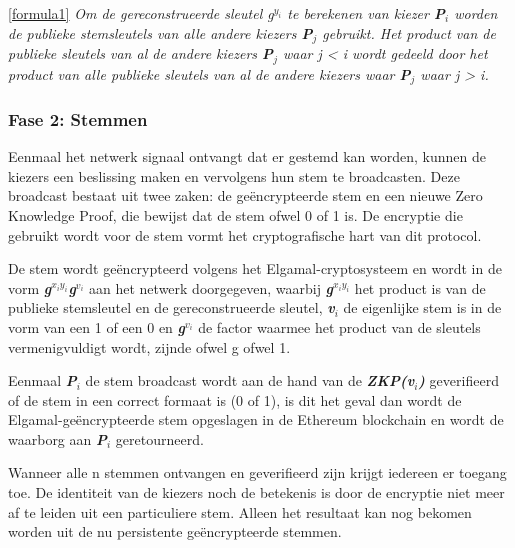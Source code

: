 			\eqref{formula1} \textit{Om de gereconstrueerde sleutel g$^{y_{i}}$ te berekenen van kiezer \textbf{P$_{i}$} worden de publieke stemsleutels van alle andere kiezers \textbf{P$_{j}$} gebruikt. Het product van de publieke sleutels van al de andere kiezers \textbf{P$_{j}$} waar j < i wordt gedeeld door het product van alle publieke sleutels van al de andere kiezers waar \textbf{P$_{j}$} waar  j > i.}
			
		\subsubsection*{Fase 2: Stemmen}
			Eenmaal het netwerk signaal ontvangt dat er gestemd kan worden, kunnen de kiezers een beslissing maken en vervolgens hun stem te broadcasten. Deze broadcast bestaat uit twee zaken: de geëncrypteerde stem en een nieuwe Zero Knowledge Proof, die bewijst dat de stem ofwel 0 of 1 is. De encryptie die gebruikt wordt voor de stem vormt het cryptografische hart van dit protocol. 
			
			De stem wordt geëncrypteerd volgens het Elgamal-cryptosysteem en wordt in de vorm  \textbf{\textit{g$^{x_{i}y_{i}}$g$^{v_{i}}$}} aan het netwerk doorgegeven,  waarbij  \textbf{\textit{g$^{x_{i}y_{i}}$}} het product is van de publieke stemsleutel en de gereconstrueerde sleutel, \textbf{\textit{v$_{i}$}} de eigenlijke stem is in de vorm van een 1 of een 0 en \textbf{\textit{g$^{v_{i}}$}} de factor waarmee het product van de sleutels vermenigvuldigt wordt, zijnde ofwel g ofwel 1. 
			
			Eenmaal \textbf{\textit{P$_{i}$}} de stem broadcast wordt aan de hand van de \textbf{\textit{ZKP(v$_{i}$)}} geverifieerd of de stem in een correct formaat is (0 of 1), is dit het geval dan wordt de Elgamal-geëncrypteerde stem opgeslagen in de Ethereum blockchain en wordt de waarborg aan \textbf{\textit{P$_{i}$}} geretourneerd.
			
			Wanneer alle n stemmen ontvangen en geverifieerd zijn krijgt iedereen er toegang toe. De identiteit van de kiezers noch de betekenis is door de encryptie niet meer af te leiden uit een particuliere stem. Alleen het resultaat kan nog bekomen worden uit de nu persistente geëncrypteerde stemmen.
			
